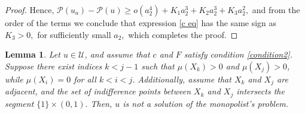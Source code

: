 \documentclass[12pt,reqno]{amsart}
\newtheorem{lem}{Lemma}
\begin{document}
\begin{proof}
Hence, $\mathcal{P}(u_a)-\mathcal{P}(u)%
\ge o(a_2^4)+K_1a_2^3+K_2a_2^3+K_3a_2^2,$ and from the order of the terms we conclude that expression \eqref{c eq} has the same sign as $K_3>0,$ for sufficiently small $a_2,$ which completes the proof.
\end{proof}







\begin{lem}\label{between2}
     Let $ u \in \mathcal{U} $, and assume that $ c $ and $ F $ satisfy condition \ref{condition2}. Suppose there exist indices $ k < j - 1 $ such that $ \mu(X_k) > 0 $ and $ \mu(X_j) > 0 $, while $ \mu(X_i) = 0 $ for all $ k < i < j $. Additionally, assume that $ X_k $ and $ X_j $ are adjacent, and the set of indifference points between $ X_k $ and $ X_j $ intersects the segment $\{1\}\times(0,1).$ Then, $u$ is not a solution of the monopolist's problem. 
\end{lem}
\end{document}
